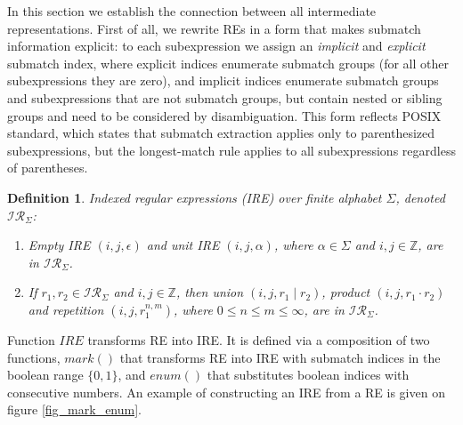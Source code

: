 \documentclass[AMA,STIX1COL]{WileyNJD-v2}
\newcommand{\Xund}{\rule{.4em}{.4pt}}
\newcommand{\XI}{\mathcal{I}}
\newcommand{\XIR}{\XI\!\XR}
\newcommand{\XR}{\mathcal{R}}
\newcommand{\YZ}{\mathbb{Z}}
\newcommand{\IRE}{I\!RE}
\newtheorem{Xdef}{Definition}
\begin{document}
In this section we establish the connection between all intermediate representations.
First of all, we rewrite REs in a form that makes submatch information explicit:
to each subexpression we assign an \emph{implicit} and \emph{explicit} submatch index, where
explicit indices enumerate submatch groups (for all other subexpressions they are zero),
and implicit indices enumerate submatch groups and subexpressions that are not submatch groups,
but contain nested or sibling groups and need to be considered by disambiguation.
This form reflects POSIX standard, which states that
submatch extraction applies only to parenthesized subexpressions,
but the longest-match rule applies to all subexpressions regardless of parentheses.

    \begin{Xdef}
    \emph{Indexed regular expressions (IRE)} over finite alphabet $\Sigma$, denoted $\XIR_\Sigma$:
    \begin{enumerate}
        \item
          Empty IRE $(i, j, \epsilon)$ and
          unit IRE $(i, j, \alpha)$, where $\alpha \in \Sigma$ and $i, j \in \YZ$,
          are in $\XIR_\Sigma$.

        \item If $r_1, r_2 \in \XIR_\Sigma$ and $i, j \in \YZ$, then
          union $(i, j, r_1 \mid r_2)$,
          product $(i, j, r_1 \cdot r_2)$ and
          repetition $(i, j, r_1^{n, m})$, where $0 \leq n \leq m \leq \infty$,
          are in $\XIR_\Sigma$.
    \end{enumerate}
    \end{Xdef}

Function $\IRE$ transforms RE into IRE.
It is defined via a composition of two functions,
$mark()$ that transforms RE into IRE with submatch indices in the boolean range $\{0, 1\}$,
and $enum()$ that substitutes boolean indices with consecutive numbers.
An example of constructing an IRE from a RE is given on figure \ref{fig_mark_enum}.
\end{document}
